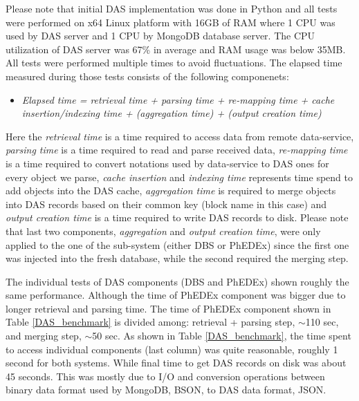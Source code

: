 \documentclass[1p,times]{elsarticle}
\begin{document}
Please note that initial DAS implementation was done in Python 
and all tests were performed on x64 Linux platform with 16GB of RAM where
1 CPU was used by DAS server and 1 CPU by MongoDB database server. The CPU utilization
of DAS server was 67\% in average and RAM usage was below 35MB. 
All tests were performed multiple times to avoid fluctuations. 
The elapsed time measured during those tests consists of the 
following componenets:
\begin{itemize}
\item[]
{\it
Elapsed time = retrieval time + parsing time + re-mapping time 
        + cache insertion/indexing time 
        + (aggregation time) + (output creation time)
}
\end{itemize}
Here the {\it retrieval time} is a time required to access data from remote data-service,
{\it parsing time} is a time required to read and parse received data, {\it re-mapping time}
is a time required to convert notations used by data-service to DAS ones for every object
we parse, {\it cache insertion} and {\it indexing time} represents time spend to add objects into
the DAS cache, {\it aggregation time} is required to merge objects into DAS records based
on their common key (block name in this case) and {\it output creation time}
is a time required to write DAS records to disk. Please note that last two
components, {\it aggregation} and {\it output creation time}, were only applied to
the one of the sub-system (either DBS or PhEDEx) since the first one was injected into
the fresh database, while the second required the merging step.

%

The individual tests of DAS components (DBS and PhEDEx) shown roughly 
the same performance. Although the time of PhEDEx component was bigger 
due to longer retrieval and parsing time.
The time of PhEDEx component shown in Table \ref{DAS_benchmark} is divided 
among: retrieval + parsing step, $\sim$110 sec, and merging step, $\sim$50 sec.
As shown in Table \ref{DAS_benchmark},
the time spent to access individual components (last column) was quite
reasonable, roughly 1 second for both systems. While final time to
get DAS records on disk was about 45 seconds. This was mostly due to I/O and
conversion operations between binary data format used by MongoDB, BSON, to DAS
data format, JSON.
\end{document}
